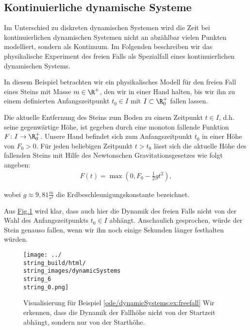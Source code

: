 \documentclass[letterpaper,10pt,english]{jupyterBook}
\begin{document}
\subsection{Kontinuierliche dynamische Systeme}
\label{\detokenize{ode/dynamicSystems:kontinuierliche-dynamische-systeme}}
\par
Im Unterschied zu diskreten dynamischen Systemen wird die Zeit bei kontinuierlichen dynamischen Systemen nicht an abzählbar vielen Punkten modelliert, sondern als Kontinuum.
Im Folgenden beschreiben wir das physikalische Experiment des freien Falls als Spezialfall eines kontinuierlichen dynamischen Systems.
\label{ode/dynamicSystems:ex:freefall}
\begin{example}{}{}



\par
In diesem Beispiel betrachten wir ein physikalisches Modell für den freien Fall eines Steins mit Masse \(m \in \R^+\), den wir in einer Hand halten, bis wir ihn zu einem definierten Anfangszeitpunkt \(t_0 \in I\) mit \(I \subset \R^+_0\) fallen lassen.

\par
Die aktuelle Entfernung des Steins zum Boden zu einem Zeitpunkt \(t \in I\), d.h. seine gegenwärtige Höhe, ist gegeben durch eine monoton fallende Funktion \(F \colon I \rightarrow \R^+_0\).
Unsere Hand befindet sich zum Anfangszeitpunkt \(t_0\) in einer Höhe von \(F_0 > 0\).
Für jeden beliebigen Zeitpunkt \(t > t_0\) lässt sich die aktuelle Höhe des fallenden Steins mit Hilfe des Newtonschen Gravitationsgesetzes wie folgt angeben:
\begin{align*}
F(t) = \max(0, F_0 - \frac{1}{2}gt^2),
\end{align*}
\par
wobei \(g \approx 9,81 \frac{m}{s^2}\) die Erdbeschleunigungskonstante bezeichnet.

\par
Aus \hyperref[\detokenize{ode/dynamicSystems:fig-free-fall}]{Fig.\@ \ref{\detokenize{ode/dynamicSystems:fig-free-fall}}} wird klar, dass auch hier die Dynamik des freien Falls nicht von der Wahl des Anfangszeitpunkts \(t_0 \in I\) abhängt.
Anschaulich gesprochen, würde der Stein genauso fallen, wenn wir ihn noch einige Sekunden länger festhalten würden.
\end{example}

\begin{figure}[htbp]
\centering


\noindent\texttt{[image: ../\\string\_build/html/\\string\_images/dynamicSystems\\string\_6\\string\_0.png]}
\caption{Visualisierung für Beispiel \cref{ode/dynamicSystems:ex:freefall}  Wir erkennen, dass die Dynamik der Fallhöhe nicht von der Startzeit abhängt, sondern nur von der Starthöhe.}\label{\detokenize{ode/dynamicSystems:fig-free-fall}}\end{figure}
\end{document}
